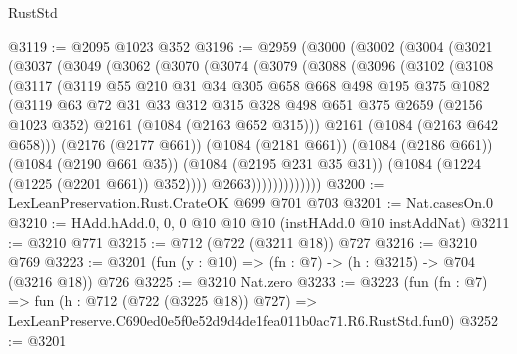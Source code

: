 \begin{lexlean}{RustStd}
\begin{coremodule}
@3119 := @2095 @1023 @352
@3196 := @2959
    (@3000
      (@3002
        (@3004
          (@3021
            (@3037
              (@3049
                (@3062
                  (@3070
                    (@3074
                      (@3079
                        (@3088
                          (@3096
                            (@3102
                              (@3108
                                (@3117
                                  (@3119
                                    @55
                                    @210
                                    @31
                                    @34
                                    @305
                                    @658
                                    @668
                                    @498
                                    @195
                                    @375
                                    @1082
                                    (@3119
                                      @63
                                      @72
                                      @31
                                      @33
                                      @312
                                      @315
                                      @328
                                      @498
                                      @651
                                      @375
                                      @2659
                                      (@2156 @1023 @352)
                                      @2161
                                      (@1084 (@2163 @652 @315)))
                                    @2161
                                    (@1084 (@2163 @642 @658)))
                                  (@2176 (@2177 @661))
                                  (@1084 (@2181 @661))
                                  (@1084 (@2186 @661))
                                  (@1084 (@2190 @661 @35))
                                  (@1084 (@2195 @231 @35 @31))
                                  (@1084 (@1224 (@1225 (@2201 @661)) @352))))
                              @2663)))))))))))))
@3200 := LexLeanPreservation.Rust.CrateOK @699 @701 @703
@3201 := Nat.casesOn.{0}
@3210 := HAdd.hAdd.{0, 0, 0} @10 @10 @10 (instHAdd.{0} @10 instAddNat)
@3211 := @3210 @771
@3215 := @712 (@722 (@3211 @18)) @727
@3216 := @3210 @769
@3223 := @3201 (fun (y : @10) => (fn : @7) -> (h : @3215) -> @704 (@3216 @18)) @726
@3225 := @3210 Nat.zero
@3233 := @3223
    (fun (fn : @7) =>
    fun (h : @712 (@722 (@3225 @18)) @727) =>
    LexLeanPreserve.C690ed0e5f0e52d9d4de1fea011b0ac71.R6.RustStd.fun0)
@3252 := @3201

\end{coremodule}
\end{lexlean}

